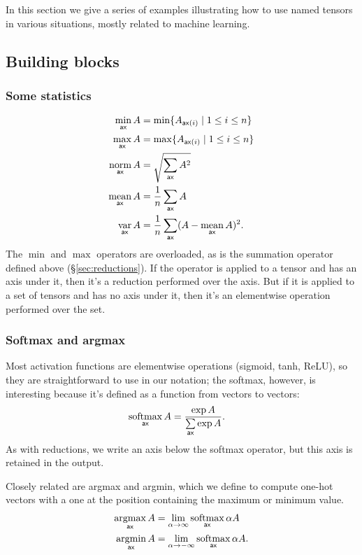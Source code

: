 \documentclass{article}
\begin{document}
In this section we give a series of examples illustrating how to use named tensors in various situations, mostly related to machine learning.

\subsection{Building blocks}

\subsubsection{Some statistics}

\begin{align*}
  \mathop{\underset{\mathsf{ax}}{\mathrm{min}}} A &= \min \{A_{\mathsf{ax}(i)} \mid 1 \leq i \leq n\} \\
  \mathop{\underset{\mathsf{ax}}{\mathrm{max}}} A &= \max \{A_{\mathsf{ax}(i)} \mid 1 \leq i \leq n\} \\
  \mathop{\underset{\mathsf{ax}}{\mathrm{norm}}} A &= \sqrt{\sum\limits_{\mathsf{ax}} A^2} \\
  \mathop{\underset{\mathsf{ax}}{\mathrm{mean}}} A &= \frac{1}{n} \sum\limits_{\mathsf{ax}} A \\
  \mathop{\underset{\mathsf{ax}}{\mathrm{var}}} A &= \frac{1}{n} \sum\limits_{\mathsf{ax}} (A - \mathop{\underset{\mathsf{ax}}{\mathrm{mean}}} A)^2.
\end{align*}
The $\min$ and $\max$ operators are overloaded, as is the summation operator defined above (\S\ref{sec:reductions}). If the operator is applied to a tensor and has an axis under it, then it's a reduction performed over the axis. But if it is applied to a set of tensors and has no axis under it, then it's an elementwise operation performed over the set.

\subsubsection{Softmax and argmax}

Most activation functions are elementwise operations (sigmoid, tanh, ReLU), so they are straightforward to use in our notation; the softmax, however, is interesting because it's defined as a function from vectors to vectors:
\begin{align*}
  \mathop{\underset{\mathsf{ax}}{\mathrm{softmax}}} A &= \frac{\exp A}{\sum\limits_{\mathsf{ax}} \exp A}.
\end{align*}
As with reductions, we write an axis below the softmax operator, but this axis is retained in the output.

Closely related are argmax and argmin, which we define to compute one-hot vectors with a one at the position containing the maximum or minimum value.
\begin{align*}
  \mathop{\underset{\mathsf{ax}}{\mathrm{argmax}}} A &= \lim_{\alpha \rightarrow \infty} \mathop{\underset{\mathsf{ax}}{\mathrm{softmax}}} \alpha A \\
  \mathop{\underset{\mathsf{ax}}{\mathrm{argmin}}} A &= \lim_{\alpha \rightarrow -\infty} \mathop{\underset{\mathsf{ax}}{\mathrm{softmax}}} \alpha A.
\end{align*}
\end{document}

